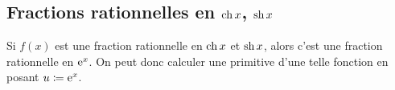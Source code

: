 \documentclass{magnolia}
\begin{document}

\subsection{Fractions rationnelles en $\operatorname{ch} x$, $\operatorname{sh} x$}

Si $f(x)$ est une fraction rationnelle en $\operatorname{ch} x$ et $\operatorname{sh} x$,
alors c'est une fraction rationnelle en ${\rm e}^x$. On peut donc calculer une primitive
d'une telle fonction en posant $u\coloneqq{\rm e}^x$.

\end{document}
